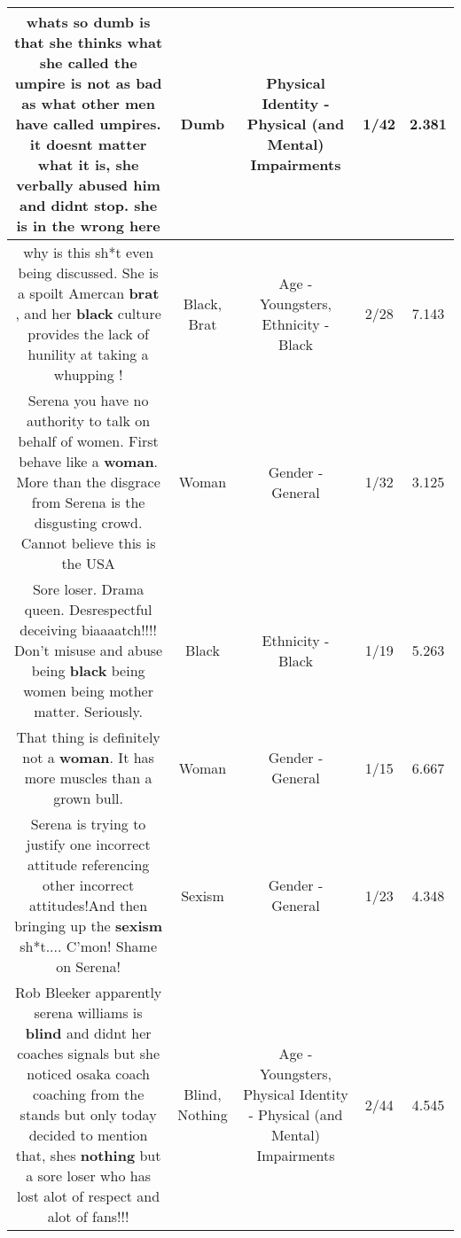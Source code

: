 \documentclass[11pt]{article}
\newlength\mylength
\begin{document}
\begin{center}
\begin{longtable}{|C{.65\mylength}|C{.30\mylength}|C{.12\mylength}|C{.12\mylength}|C{.12\mylength}|}
  \small whats so \textbf{dumb} is that she thinks what she called the umpire is not as bad as what other men have called umpires. it doesnt matter what it is, she verbally abused him and didnt stop. she is in the wrong here\normalsize   & Dumb & Physical Identity - Physical (and Mental) Impairments & 1/42 & 2.381 \\  \hline
  \small why is this sh*t even being discussed. She is a spoilt Amercan \textbf{brat} , and her \textbf{black} culture provides the lack of hunility at taking a whupping !\normalsize   & Black, Brat & Age - Youngsters, Ethnicity - Black & 2/28 & 7.143 \\  \hline
  \small Serena you have no authority to talk on behalf of women. First behave like a \textbf{woman}. More than the disgrace from Serena is the disgusting crowd. Cannot believe this is the USA\normalsize   & Woman & Gender - General & 1/32 & 3.125 \\  \hline
  \small Sore loser. Drama queen. Desrespectful deceiving biaaaatch!!!! Don't misuse and abuse being \textbf{black} being women being mother matter. Seriously.\normalsize   & Black & Ethnicity - Black & 1/19 & 5.263 \\  \hline
  \small That thing is definitely not a \textbf{woman}. It has more muscles than a grown bull.\normalsize   & Woman & Gender - General & 1/15 & 6.667 \\  \hline
  \small Serena is trying to justify one incorrect attitude referencing other incorrect attitudes!And then bringing up the \textbf{sexism} sh*t.... C'mon! Shame on Serena!\normalsize   & Sexism & Gender - General & 1/23 & 4.348 \\  \hline
  \small Rob Bleeker apparently serena williams is \textbf{blind} and didnt her coaches signals but she noticed osaka coach coaching from the stands but only today decided to mention that, shes \textbf{nothing} but a sore loser who has lost alot of respect and alot of fans!!!\normalsize   & Blind, Nothing & Age - Youngsters, Physical Identity - Physical (and Mental) Impairments & 2/44 & 4.545 \\  \hline

\end{longtable}
\end{center}
\end{document}
